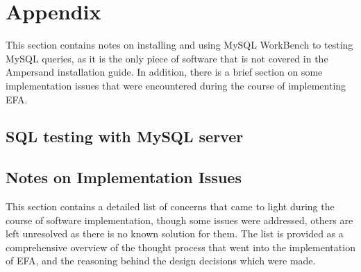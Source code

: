 \section*{Appendix}
This section contains notes on installing and using MySQL WorkBench to testing 
MySQL queries, as it is the only piece of software that is not covered in the 
Ampersand installation guide. In addition, there is a brief section on some 
implementation issues that were encountered during the course of implementing 
EFA.
\subsection*{SQL testing with MySQL server}

\subsection*{Notes on Implementation Issues}

This section contains a detailed list of concerns that came to light during the 
course of software implementation, though some issues were addressed, others 
are left unresolved as there is no known solution for them. The list is 
provided as a comprehensive overview of the thought process that went into the 
implementation of EFA, and the reasoning behind the design decisions which were 
made.

